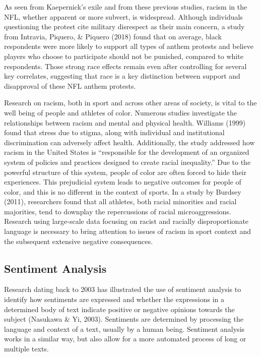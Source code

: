 \documentclass[12pt,twoside]{reedthesis}
\begin{document}
As seen from Kaepernick's exile and from these previous studies, racism
in the NFL, whether apparent or more subvert, is widespread. Although
individuals questioning the protest cite military disrespect as their
main concern, a study from Intravia, Piquero, \& Piquero (2018) found
that on average, black respondents were more likely to support all types
of anthem protests and believe players who choose to participate should
not be punished, compared to white respondents. Those strong race
effects remain even after controlling for several key correlates,
suggesting that race is a key distinction between support and
disapproval of these NFL anthem protests.

Research on racism, both in sport and across other areas of society, is
vital to the well being of people and athletes of color. Numerous
studies investigate the relationships between racism and mental and
physical health. Williams (1999) found that stress due to stigma, along
with individual and institutional discrimination can adversely affect
health. Additionally, the study addressed how racism in the United
States is ``responsible for the development of an organized system of
policies and practices designed to create racial inequality.'' Due to
the powerful structure of this system, people of color are often forced
to hide their experiences. This prejudicial system leads to negative
outcomes for people of color, and this is no different in the context of
sports. In a study by Burdsey (2011), researchers found that all
athletes, both racial minorities and racial majorities, tend to downplay
the repercussions of racial microaggressions. Research using large-scale
data focusing on racist and racially disproportionate language is
necessary to bring attention to issues of racism in sport context and
the subsequent extensive negative consequences.

\subsection{Sentiment Analysis}\label{sentiment-analysis}

Research dating back to 2003 has illustrated the use of sentiment
analysis to identify how sentiments are expressed and whether the
expressions in a determined body of text indicate positive or negative
opinions towards the subject (Nasukawa \& Yi, 2003). Sentiments are
determined by processing the language and context of a text, usually by
a human being. Sentiment analysis works in a similar way, but also allow
for a more automated process of long or multiple texts.
\end{document}
